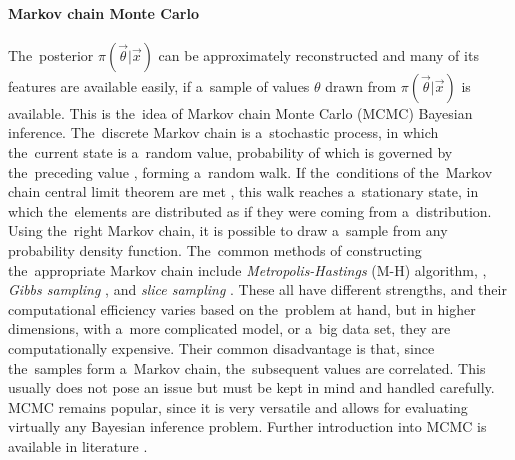 \paragraph{Markov chain Monte Carlo}
The~posterior $\pi(\vec{\theta}|\vec{x})$ can be approximately reconstructed and many of its features are available easily, if a~sample of values $\theta$ drawn from $\pi(\vec{\theta}|\vec{x})$ is available. This is the~idea of Markov chain Monte Carlo ({MCMC}) Bayesian inference. The~discrete Markov chain is a~stochastic process, in which the~current state is a~random value, probability of which is governed by the~preceding value \citep{markov1906extension}, forming a~random walk. If the~conditions of the~Markov chain central limit theorem are met \citep{jones2004markov}, this walk reaches a~stationary state, in which the~elements are distributed as if they were coming from a~distribution. Using the~right Markov chain, it is possible to draw a~sample from any probability density function. The~common methods of constructing the~appropriate Markov chain include \textit{Metropolis-Hastings} ({M-H}) algorithm, \citep{metropolis1953equation,hastings1970monte}, \textit{Gibbs sampling} \citep{geman1984stochastic}, and \textit{slice sampling} \citep{damlen1999gibbs}. These all have different strengths, and their computational efficiency varies based on the~problem at hand, but in higher dimensions, with a~more complicated model, or a~big data set, they are computationally expensive. Their common disadvantage is that, since the~samples form a~Markov chain, the~subsequent values are correlated. This usually does not pose an issue but must be kept in mind and handled carefully. MCMC remains popular, since it is very versatile and allows for evaluating virtually any Bayesian inference problem. Further introduction into MCMC is available in literature \citep{brooks2011handbook}. 

